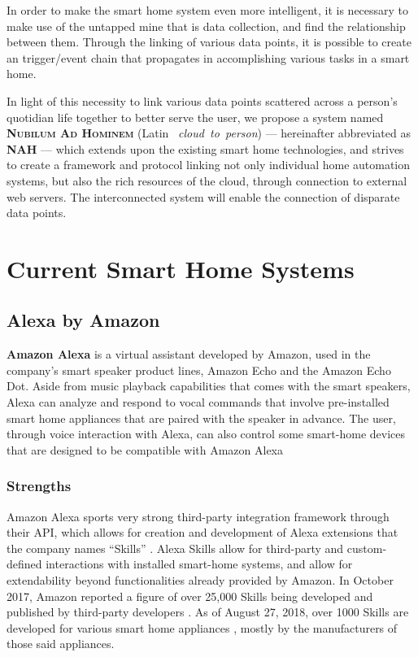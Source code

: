 \documentclass[letterpaper, twocolumn, 10pt, conference]{IEEEtran}
\newcommand{\term}[1]{\textbf{#1}}
\begin{document}
In order to make the smart home system even more intelligent, it is necessary to make use of the untapped mine that is data collection, and find the relationship between them. Through the linking of various data points, it is possible to create an trigger/event chain that propagates in accomplishing various tasks in a smart home.

In light of this necessity to link various data points scattered across a person's quotidian life together to better serve the user, we propose a system named \term{\textsc{Nubilum Ad Hominem}} (Latin ~\textit{cloud~to~person}) --- hereinafter abbreviated as \term{NAH} --- which extends upon the existing smart home technologies, and strives to create a framework and protocol linking not only individual home automation systems, but also the rich resources of the cloud, through connection to external web servers. The interconnected system will enable the connection of disparate data points.

\section{Current Smart Home Systems} \label{sec:investigation_current_systems}

\subsection{Alexa by Amazon} \label{ssec:amazon_alexa}

\term{Amazon Alexa} is a virtual assistant developed by Amazon, used in the company's smart speaker product lines, Amazon Echo and the Amazon Echo Dot. Aside from music playback capabilities that comes with the smart speakers, Alexa can analyze and respond to vocal commands that involve pre-installed smart home appliances that are paired with the speaker in advance. The user, through voice interaction with Alexa, can also control some smart-home devices that are designed to be compatible with Amazon Alexa

\subsubsection*{Strengths} \label{sssec:alexa_strengths}

Amazon Alexa sports very strong third-party integration framework through their API, which allows for creation and development of Alexa extensions that the company names \enquote{Skills} \cite{amazon2018understand}. Alexa Skills allow for third-party and custom-defined interactions with installed smart-home systems, and allow for extendability beyond functionalities already provided by Amazon. In October 2017, Amazon reported a figure of over 25,000 Skills being developed and published by third-party developers \cite{businesswire2017amazonQ3}. As of August 27, 2018, over 1000 Skills are developed for various smart home appliances \cite{amazon_alexa_skills}, mostly by the manufacturers of those said appliances.
\end{document}
